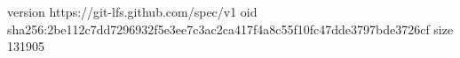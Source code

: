 version https://git-lfs.github.com/spec/v1
oid sha256:2be112c7dd7296932f5e3ee7c3ac2ca417f4a8c55f10fc47dde3797bde3726cf
size 131905
